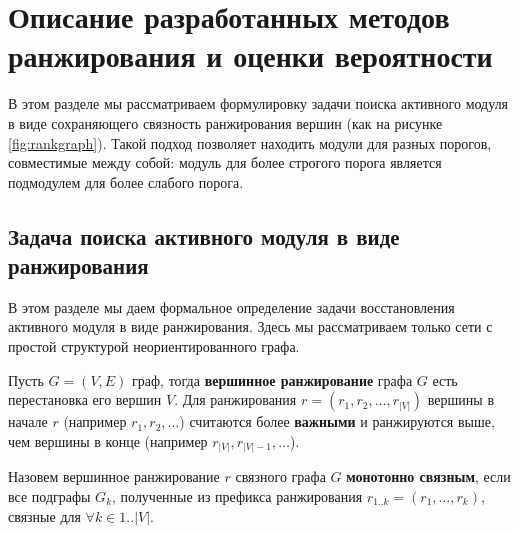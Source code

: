 \chapter{Описание разработанных методов ранжирования и оценки вероятности}

В этом разделе мы рассматриваем формулировку задачи поиска активного 
модуля в виде сохраняющего связность ранжирования вершин (как на рисунке \ref{fig:rankgraph}).
Такой подход позволяет находить модули для разных порогов, 
совместимые между собой: модуль для более строгого порога
является подмодулем для более слабого порога.





\section{Задача поиска активного модуля в виде ранжирования}
\label{sec_formal_defs}

В этом разделе мы даем формальное определение задачи восстановления активного
модуля в виде ранжирования. Здесь мы рассматриваем только сети с простой
структурой неориентированного графа.

\begin{definition}
    Пусть $G = (V, E)$ граф, тогда \textbf{вершинное ранжирование} графа $G$ есть
    перестановка его вершин $V$.  Для ранжирования $r = (r_1, r_2, \ldots,
    r_{|V|})$ вершины в начале $r$ (например $r_1, r_2, \ldots$) считаются
    более \textbf{важными} и ранжируются выше, чем вершины в конце (например
    $r_{|V|}, r_{|V|-1}, \ldots$).
\end{definition}

\begin{definition}
    Назовем вершинное ранжирование $r$ связного графа $G$ \textbf{монотонно
    связным}, если все подграфы $G_k$, полученные из префикса ранжирования
    $r_{1..k} = (r_1, \ldots, r_k)$, связные для $\forall k \in {1..|V|}$.
\end{definition}

